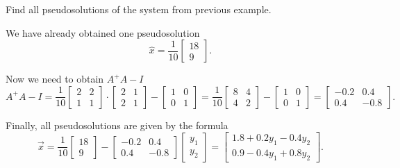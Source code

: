     \Ex
    Find all pseudosolutions of the system from previous example. 
    
    We have already obtained one pseudosolution
    \[
        \hat{x} = \dfrac{1}{10}\begin{bmatrix}
            18\\
            9
        \end{bmatrix}.  
    \]
    
    Now we need to obtain $A^+A-I$
    \[
        A^+A-I = \dfrac{1}{10} \begin{bmatrix}
            2 & 2 \\
            1 & 1
        \end{bmatrix} \cdot \begin{bmatrix}
            2 & 1\\
            2 & 1
        \end{bmatrix} - \begin{bmatrix}
            1 & 0\\
            0 & 1
        \end{bmatrix} = \dfrac{1}{10}\begin{bmatrix}
            8 & 4 \\
            4 & 2
        \end{bmatrix} - \begin{bmatrix}
            1 & 0 \\
            0 & 1
        \end{bmatrix} = \begin{bmatrix}
            -0.2 & 0.4 \\
            0.4 & -0.8
        \end{bmatrix}.
    \]
    
    Finally, all pseudosolutions are given by the formula
    \[
        \vec{x} = \dfrac{1}{10}\begin{bmatrix}
            18 \\ 9
        \end{bmatrix} - \begin{bmatrix}
            -0.2 & 0.4\\
            0.4 & -0.8
        \end{bmatrix}  \begin{bmatrix}
            y_1 \\
            y_2
        \end{bmatrix} = \begin{bmatrix}
            1.8 + 0.2y_1 - 0.4 y_2\\
            0.9 - 0.4y_1 + 0.8y_2
        \end{bmatrix}.
    \]
    
